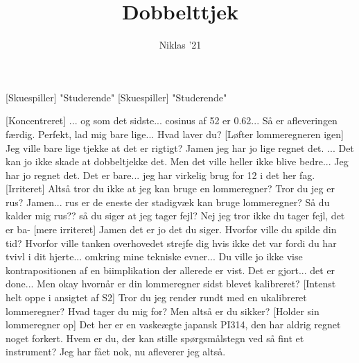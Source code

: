 \documentclass[a4paper,11pt]{article}
\title{Dobbelttjek}
\author{Niklas '21}
\begin{document}
\maketitle

\begin{roles}
[Skuespiller] "Studerende"
[Skuespiller] "Studerende"
\end{roles}

\begin{sketch}
[Koncentreret] ... og som det sidste... cosinus af 52 er 0.62... Så er afleveringen færdig.
 Perfekt, lad mig bare lige...
 Hvad laver du?
[Løfter lommeregneren igen] Jeg ville bare lige tjekke at det er rigtigt?
 Jamen jeg har jo lige regnet det.
 ... Det kan jo ikke skade at dobbeltjekke det.
 Men det ville heller ikke blive bedre... Jeg har jo regnet det.
 Det er bare... jeg har virkelig brug for 12 i det her fag.
[Irriteret] Altså tror du ikke at jeg kan bruge en lommeregner? Tror du jeg er rus?
 Jamen... rus er de eneste der stadigvæk kan bruge lommeregner?
 Så du kalder mig rus?? så du siger at jeg tager fejl?
 Nej jeg tror ikke du tager fejl, det er ba-
[mere irriteret] Jamen det er jo det du siger. Hvorfor ville du spilde din tid? Hvorfor ville tanken overhovedet strejfe dig hvis ikke det var fordi du har tvivl i dit hjerte... omkring mine tekniske evner...
 Du ville jo ikke vise kontrapositionen af en biimplikation der allerede er vist. Det er gjort... det er done...
 Men okay hvornår er din lommeregner sidst blevet kalibreret?
[Intenst helt oppe i ansigtet af S2] Tror du jeg render rundt med en ukalibreret lommeregner? Hvad tager du mig for?
 Men altså er du sikker?
[Holder sin lommeregner op] Det her er en vaskeægte japansk PI314, den har aldrig regnet noget forkert. Hvem er du, der kan stille spørgsmålstegn ved så fint et instrument?
 Jeg har fået nok, nu afleverer jeg altså.

\end{sketch}
\end{document}
